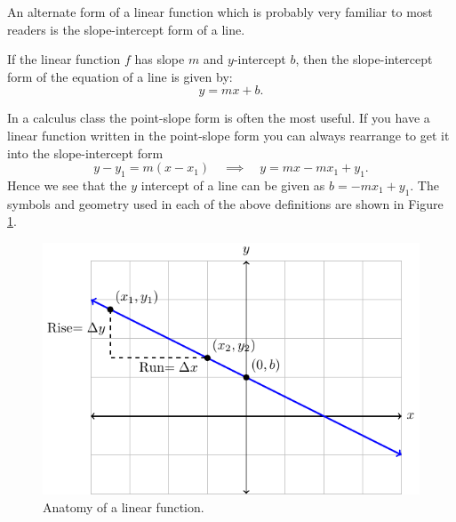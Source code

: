 An alternate form of a linear function which is probably very familiar to most readers is
the slope-intercept form of a line.
\begin{definition}
If the linear function $f$ has slope $m$ and $y$-intercept $b$, then the
slope-intercept form of the equation of a line is given by: 
\[ y=mx + b.  \]
\end{definition}
In a calculus class the point-slope form is often the most useful.  If you have a linear
function written in the point-slope form you can always rearrange to get it into the
slope-intercept form
\[ y - y_1 = m(x-x_1) \quad \implies \quad y = mx - m x_1 + y_1. \]
Hence we see that the $y$ intercept of a line can be given as $b = -mx_1 + y_1$.
The
symbols and geometry used in each of the above definitions are shown in Figure
\ref{fig:0.1.linear_fn}.

\begin{figure}[ht!]
    \centering
    \includegraphics[width=0.6\columnwidth]{figures/0-1-fig4.pdf}
    \caption{Anatomy of a linear function.}
    \label{fig:0.1.linear_fn}
\end{figure}


